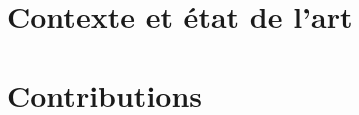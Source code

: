 \documentclass{these-dbl}
\begin{document}



\clearemptydoublepage


\frontmatter
\clearemptydoublepage
\renewcommand{\contentsname}{Table des Matières}
\tableofcontents %

\clearemptydoublepage


\part{Contexte et état de l'art}

\clearemptydoublepage
\mainmatter


\clearemptydoublepage


\part{Contributions}

\clearemptydoublepage


\clearemptydoublepage


\clearemptydoublepage


\clearemptydoublepage
\backmatter


\clearemptydoublepage
{} %

\nocite{*}
\printbibliography

\clearemptydoublepage
\cleartoevenpage[\thispagestyle{empty}]

\end{document}
